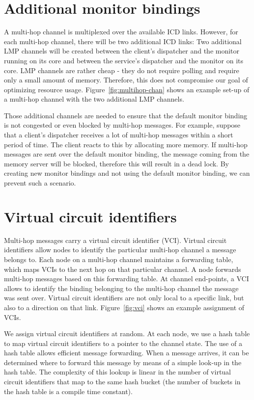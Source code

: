 \documentclass[a4paper,twoside]{report} %
\begin{document}
\section{Additional monitor bindings}
A multi-hop channel is multiplexed over the available ICD links. However, for each multi-hop channel, there will be two additional ICD links: Two additional LMP channels will be created between the client's dispatcher and the monitor running on its core and between the service's dispatcher and the monitor on its core. LMP channels are rather cheap - they do not require polling and require only a small amount of memory. Therefore, this does not compromise our goal of optimizing resource usage. Figure~\ref{fig:multihop-chan} shows an example set-up of a multi-hop channel with the two additional LMP channels. 

Those additional channels are needed to ensure that the default monitor binding is not congested or even blocked by multi-hop messages. For example, suppose that a client's dispatcher receives a lot of multi-hop messages within a short period of time. The client reacts to this by allocating more memory. If multi-hop messages are sent over the default monitor binding, the message coming from the memory server will be blocked, therefore this will result in a dead lock. By creating new monitor bindings and not using the default monitor binding, we can prevent such a scenario.


\section{Virtual circuit identifiers}
\label{section:vcis}
Multi-hop messages carry a virtual circuit identifier (VCI). Virtual circuit identifiers allow nodes to identify the particular multi-hop channel a message belongs to. Each node on a multi-hop channel maintains a forwarding table, which maps VCIs to the next hop on that particular channel. A node forwards multi-hop messages based on this forwarding table. At channel end-points, a VCI allows to identify the binding belonging to the multi-hop channel the message was sent over. Virtual circuit identifiers are not only local to a specific link, but also to a direction on that link. Figure~\ref{fig:vci} shows an example assignment of VCIs.

We assign virtual circuit identifiers at random. At each node, we use a hash table to map virtual circuit identifiers to a pointer to the channel state. The use of a hash table allows efficient message forwarding. When a message arrives, it can be determined where to forward this message by means of a simple look-up in the hash table. The complexity of this lookup is linear in the number of virtual circuit identifiers that map to the same hash bucket (the number of buckets in the hash table is a compile time constant).
\end{document}
